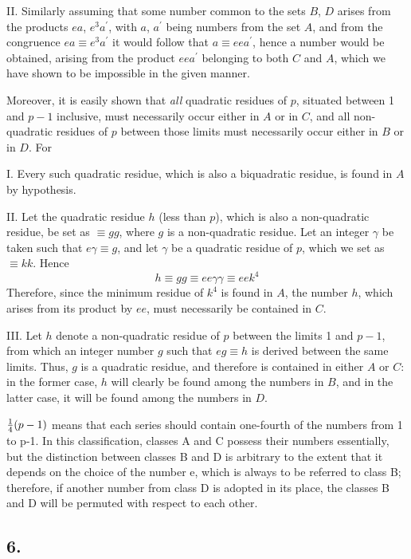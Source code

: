 \documentclass[twoside,12pt, showframe]{memoir}
\let\oldfrac\frac
\def\frac#1#2{\mathchoice{\tfrac{#1}{#2}}{\oldfrac{#1}{#2}}{\genfrac{}{}{}{2}{#1}{#2\mathstrut}}{\genfrac{}{}{}{3}{#1}{#2\mathstrut}}}
\begin{document}
II. Similarly assuming that some number common to the sets \(B\), \(D\) arises from the products \(e a\), \(e^{3} a^{\prime}\), with \(a\), \(a^{\prime}\) being numbers from the set \(A\), and from the congruence \(e a \equiv e^{3} a^{\prime}\) it would follow that \(a \equiv e e a^{\prime}\), hence a number would be obtained, arising from the product \(e e a^{\prime}\) belonging to both \(C\) and \(A\), which we have shown to be impossible in the given manner.
%

Moreover, it is easily shown that \textit{all} quadratic residues of \(p\), situated between 1 and \(p-1\) inclusive, must necessarily occur either in \(A\) or in \(C\), and all non-quadratic residues of \(p\) between those limits must necessarily occur either in \(B\) or in \(D\). For
 
I. Every such quadratic residue, which is also a biquadratic residue, is found in \(A\) by hypothesis.
 
II. Let the quadratic residue \(h\) (less than \(p\)), which is also a non-quadratic residue, be set as \(\equiv g g\), where \(g\) is a non-quadratic residue. Let an integer \(\gamma\) be taken such that \(e \gamma \equiv g\), and let \(\gamma\) be a quadratic residue of \(p\), which we set as \(\equiv k k\). Hence
\[h \equiv g g \equiv e e \gamma \gamma \equiv e e k^{4}\]
Therefore, since the minimum residue of \(k^{4}\) is found in \(A\), the number \(h\), which arises from its product by \(e e\), must necessarily be contained in \(C\).
 
III. Let \(h\) denote a non-quadratic residue of \(p\) between the limits 1 and \(p-1\), from which an integer number \(g\) such that \(e g \equiv h\) is derived between the same limits. Thus, \(g\) is a quadratic residue, and therefore is contained in either \(A\) or \(C\): in the former case, \(h\) will clearly be found among the numbers in \(B\), and in the latter case, it will be found among the numbers in \(D\).
%

\(\frac{1}{4}(p-1)\) means that each series should contain one-fourth of the numbers from 1 to p-1.  In this classification, classes A and C possess their numbers essentially, but the distinction between classes B and D is arbitrary to the extent that it depends on the choice of the number e, which is always to be referred to class B; therefore, if another number from class D is adopted in its place, the classes B and D will be permuted with respect to each other.
%

\subsection*{6.}
\end{document}
